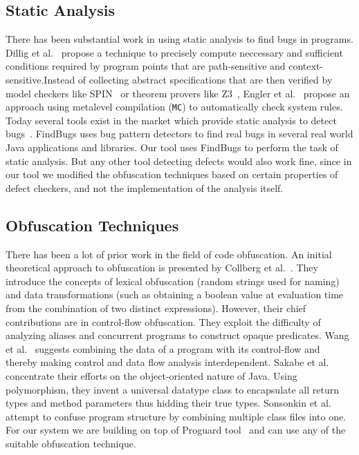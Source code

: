\documentclass[twocolumn]{article}
\begin{document}
\subsection{Static Analysis}
There has been substantial work in using static analysis to find bugs in programs. Dillig et al.~\cite{dillig} propose a technique to precisely compute neccessary and sufficient 
conditions required by program points that are path-sensitive and context-sensitive.Instead of collecting abstract specifications that are then verified by model checkers like 
SPIN~\cite{spin} or theorem provers like Z3~\cite{z3}, Engler et al.~\cite{engler} propose an approach using metalevel compilation ({\tt MC}) to automatically check system rules. 
Today several tools exist in the market which provide 
static analysis to detect bugs~\cite{coverity,klocwork,parasoft,findbugs,chess,saturn}. FindBugs \cite{findbugs} uses bug pattern detectors to find real bugs in several real world 
Java applications and libraries. Our tool uses FindBugs to perform the task of static analysis. But any other tool detecting defects would also work fine, since in our tool we 
modified the obfuscation techniques based on certain properties of defect checkers, and not the implementation of the analysis itself.

\subsection{Obfuscation Techniques}
There has been a lot of prior work in the field of code obfuscation. An initial theoretical approach to obfuscation is presented by Collberg et al.~\cite{collberg}. 
They introduce the concepts of lexical obfuscation (random strings used for naming) and data transformations (such as obtaining a boolean value at evaluation time from the combination 
of two distinct expressions). However, their chief contributions are in control-flow obfuscation. They exploit the difficulty of analyzing aliases and concurrent programs to 
construct opaque predicates. Wang et al.~\cite{wang} suggests combining the data of a program with its control-flow and thereby making control and data flow analysis interdependent. 
Sakabe et al.~\cite{sakabe} concentrate their efforts on the object-oriented nature of Java. Using polymorphism, they invent a universal datatype class to encapsulate all return types 
and method parameters thus hidding their true types. Sonsonkin et al.~\cite{sonsonkin} attempt to confuse program structure by combining multiple class files into one. For our system 
we are building on top of Proguard tool~\cite{proguard} and can use any of the suitable obfuscation technique.
\end{document}
